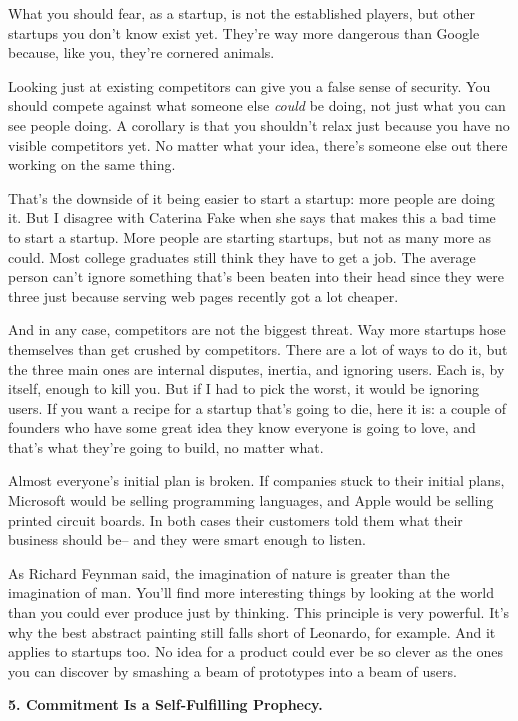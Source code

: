 \documentclass[12pt]{book}
\begin{document}
What you should fear, as a startup, is not the established players, but
other startups you don't know exist yet. They're way more dangerous than
Google because, like you, they're cornered animals.

Looking just at existing competitors can give you a false sense of
security. You should compete against what someone else \emph{could} be
doing, not just what you can see people doing. A corollary is that you
shouldn't relax just because you have no visible competitors yet. No
matter what your idea, there's someone else out there working on the
same thing.

That's the downside of it being easier to start a startup: more people
are doing it. But I disagree with Caterina Fake when she says that makes
this a bad time to start a startup. More people are starting startups,
but not as many more as could. Most college graduates still think they
have to get a job. The average person can't ignore something that's been
beaten into their head since they were three just because serving web
pages recently got a lot cheaper.

And in any case, competitors are not the biggest threat. Way more
startups hose themselves than get crushed by competitors. There are a
lot of ways to do it, but the three main ones are internal disputes,
inertia, and ignoring users. Each is, by itself, enough to kill you. But
if I had to pick the worst, it would be ignoring users. If you want a
recipe for a startup that's going to die, here it is: a couple of
founders who have some great idea they know everyone is going to love,
and that's what they're going to build, no matter what.

Almost everyone's initial plan is broken. If companies stuck to their
initial plans, Microsoft would be selling programming languages, and
Apple would be selling printed circuit boards. In both cases their
customers told them what their business should be-- and they were smart
enough to listen.

As Richard Feynman said, the imagination of nature is greater than the
imagination of man. You'll find more interesting things by looking at
the world than you could ever produce just by thinking. This principle
is very powerful. It's why the best abstract painting still falls short
of Leonardo, for example. And it applies to startups too. No idea for a
product could ever be so clever as the ones you can discover by smashing
a beam of prototypes into a beam of users.

\textbf{5. Commitment Is a Self-Fulfilling Prophecy.}
\end{document}
